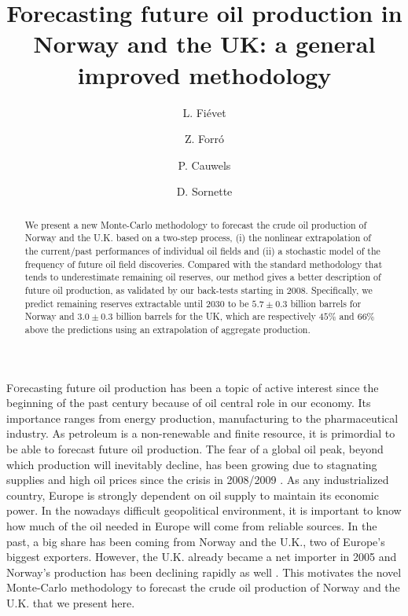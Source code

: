 \documentclass[review]{elsarticle}
\begin{document}
\thispagestyle{fancy} 


\title{Forecasting future oil production in Norway and the UK: a general improved methodology}

\author[eth-mtec]{L. Fi\'evet}

\author[eth-mtec]{Z. Forr\'o}

\author[eth-mtec]{P. Cauwels}

\author[eth-mtec]{D. Sornette}


\address[eth-mtec]{Chair of Entrepreneurial Risks, ETH Z\"urich, Scheuchzerstrasse 7 (SEC F), CH-8092 Z\"urich, Switzerland}


\maketitle
\begin{abstract}
\doublespacing
\noindent We present a new Monte-Carlo methodology to forecast
the crude oil production of Norway and the U.K. based on a two-step process,
(i) the nonlinear extrapolation of the current/past
performances of individual oil fields and (ii) a stochastic model
of the frequency of future oil field discoveries. Compared
with the standard methodology that tends to underestimate remaining oil reserves,
our method gives a better description of future oil production, as validated by
our back-tests starting in 2008. Specifically, we predict remaining reserves
extractable until 2030 to be $5.7 \pm 0.3$ billion barrels for Norway and $3.0 \pm0.3$ billion barrels for the UK, which are respectively $45\%$ and $66\%$ above the predictions using an extrapolation of aggregate production.
\end{abstract}


\lettrine[nindent=0em,lines=3] Forecasting future oil production
has been a topic of active interest since the beginning of the past
century because of oil central role in our economy. Its importance
ranges from energy production, manufacturing to the pharmaceutical
industry. As petroleum is a non-renewable and finite resource, it
is primordial to be able to forecast future oil production. The fear
of a global oil peak, beyond which production will inevitably decline,
has been growing due to stagnating supplies and high oil prices since
the crisis in 2008/2009 \citep{Murray2013}. As any industrialized
country, Europe is strongly dependent on oil supply to maintain its
economic power. In the nowadays difficult geopolitical environment,
it is important to know how much of the oil needed in Europe will
come from reliable sources. In the past, a big share has been coming
from Norway and the U.K., two of Europe's biggest exporters. However,
the U.K. already became a net importer in 2005 and Norway\textquoteright{}s
production has been declining rapidly as well \citep{Hook2008}.
This motivates the novel Monte-Carlo methodology to forecast
the crude oil production of Norway and the U.K. that we present here.
\end{document}
